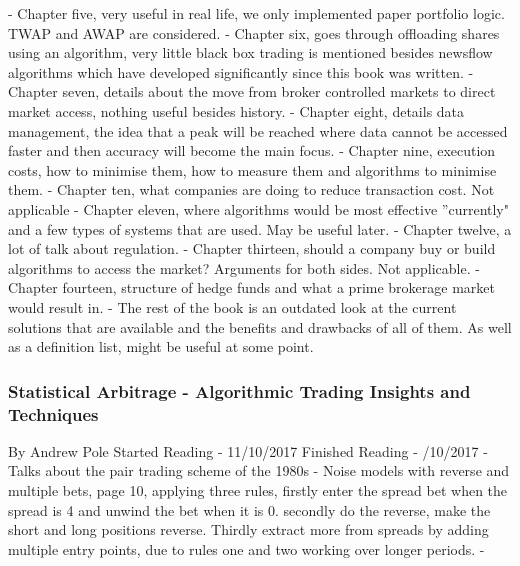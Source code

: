 \documentclass[12pt,a4paper]{article}
\begin{document}
- Chapter five, very useful in real life, we only implemented paper portfolio logic. TWAP and AWAP are considered. \newline
- Chapter six, goes through offloading shares using an algorithm, very little black box trading is mentioned besides newsflow algorithms which have developed significantly since this book was written. \newline
- Chapter seven, details about the move from broker controlled markets to direct market access, nothing useful besides history. \newline
- Chapter eight, details data management, the idea that a peak will be reached where data cannot be accessed faster and then accuracy will become the main focus. \newline
- Chapter nine, execution costs, how to minimise them, how to measure them and algorithms to minimise them. \newline
- Chapter ten, what companies are doing to reduce transaction cost. Not applicable \newline
- Chapter eleven, where algorithms would be most effective ''currently" and a few types of systems that are used. May be useful later. \newline
- Chapter twelve, a lot of talk about regulation. \newline
- Chapter thirteen, should a company buy or build algorithms to access the market? Arguments for both sides. Not applicable. \newline
- Chapter fourteen, structure of hedge funds and what a prime brokerage market would result in. \newline
- The rest of the book is an outdated look at the current solutions that are available and the benefits and drawbacks of all of them. As well as a definition list, might be useful at some point.

\subsubsection*{Statistical Arbitrage - Algorithmic Trading Insights and Techniques}
By Andrew Pole \newline
Started Reading - 11/10/2017 \newline
Finished Reading -  /10/2017 \newline
\newline
- Talks about the pair trading scheme of the 1980s
- Noise models with reverse and multiple bets, page 10, applying three rules, firstly enter the spread bet when the spread is 4 and unwind the bet when it is 0. secondly do the reverse, make the short and long positions reverse. Thirdly extract more from spreads by adding multiple entry points, due to rules one and two working over longer periods.
- 
\end{document}
